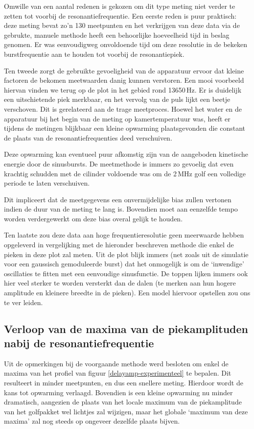 Omwille van een aantal redenen is gekozen om dit type meting niet verder te 
zetten tot voorbij de resonantiefrequentie. Een eerste reden is puur 
praktisch: deze meting bevat zo'n 130 meetpunten en het verkrijgen van deze 
data via de gebrukte, manuele methode heeft een behoorlijke hoeveelheid 
tijd in beslag genomen. Er was eenvoudigweg onvoldoende tijd om deze 
resolutie in de bekeken burstfrequentie aan te houden tot voorbij de 
resonantiepiek.


Ten tweede zorgt de gebruikte gevoeligheid van de apparatuur ervoor dat 
kleine factoren de bekomen meetwaarden danig kunnen verstoren. Een mooi 
voorbeeld hiervan vinden we terug op de plot in het gebied rond 13650\,Hz.  
Er is duidelijk een uitschietende piek merkbaar, en het vervolg van de puls 
lijkt een beetje verschoven. Dit is gerelateerd aan de trage meetproces.  
Hoewel het water en de apparatuur bij het begin van de meting op 
kamertemperatuur was, heeft er tijdens de metingen blijkbaar een kleine 
opwarming plaatsgevonden die constant de plaats van de 
resonantiefrequenties deed verschuiven.

Deze opwarming kan eventueel puur afkomstig zijn van de aangeboden 
kinetische energie door de sinusbursts. De meetmethode is immers zo 
gevoelig dat even krachtig schudden met de cilinder voldoende was om de 
2\,MHz golf een volledige periode te laten verschuiven.

Dit impliceert dat de meetgegevens een onvermijdelijke bias zullen vertonen 
indien de duur van de meting te lang is. Bovendien moet aan eenzelfde tempo 
worden verdergewerkt om deze bias overal gelijk te houden.


Ten laatste zou deze data aan hoge frequentieresolutie geen meerwaarde 
hebben opgeleverd in vergelijking met de hieronder beschreven methode die 
enkel de pieken in deze plot zal meten.  Uit de plot blijk immers (net 
zoals uit de simulatie voor een gaussisch gemoduleerde burst) dat het 
onmogelijk is om de `inwendige' oscillaties te fitten met een eenvoudige 
sinusfunctie.  De toppen lijken immers ook hier veel sterker te worden 
versterkt dan de dalen (te merken aan hun hogere amplitude en kleinere 
breedte in de pieken). Een model hiervoor opstellen zou ons te ver leiden.



\subsection{Verloop van de maxima van de piekamplituden nabij de 
resonantiefrequentie}
Uit de opmerkingen bij de voorgaande methode werd besloten om enkel de 
maxima van het profiel van figuur \ref{delayamp-experimenteel} te bepalen.  
Dit resulteert in minder meetpunten, en dus een snellere meting. Hierdoor 
wordt de kans tot opwarming verlaagd. Bovendien is een kleine opwarming nu 
minder dramatisch, aangezien de plaats van het locale maximum van de 
piekamplitude van het golfpakket wel lichtjes zal wijzigen, maar het 
globale `maximum van deze maxima' zal nog steeds op ongeveer dezelfde 
plaats bijven.

